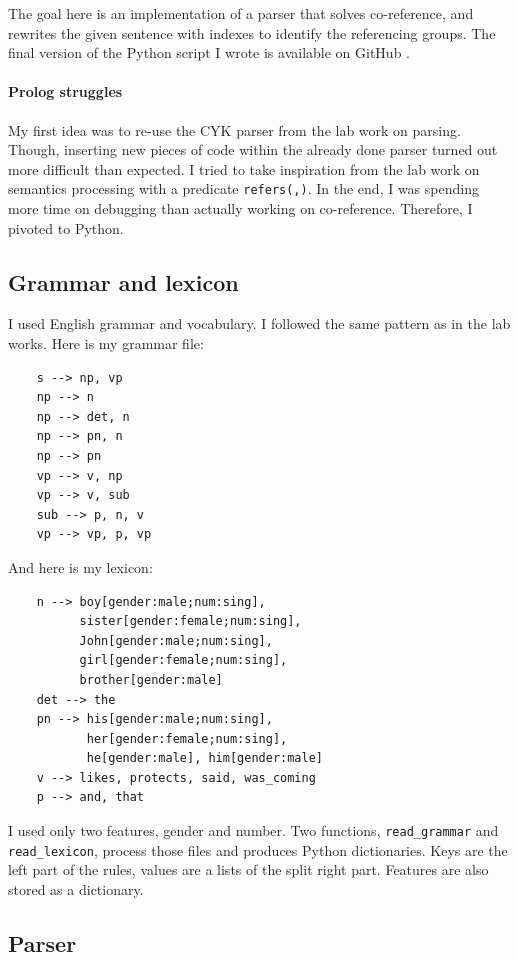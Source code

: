 \documentclass[a4paper]{article}
\theoremstyle{definition}
\begin{document}
The goal here is an implementation of a parser that solves co-reference, and rewrites the given sentence with indexes to identify the referencing groups. The final version of the Python script I wrote is available on GitHub \cite{github}.

\paragraph{Prolog struggles} My first idea was to re-use the CYK parser from the lab work on parsing. Though, inserting new pieces of code within the already done parser turned out more difficult than expected. I tried to take inspiration from the lab work on semantics processing with a predicate \texttt{refers(,)}. In the end, I was spending more time on debugging than actually working on co-reference. Therefore, I pivoted to Python.

\subsection{Grammar and lexicon}

I used English grammar and vocabulary. I followed the same pattern as in the lab works. Here is my grammar file:
\begin{verbatim}
    s --> np, vp
    np --> n
    np --> det, n
    np --> pn, n
    np --> pn
    vp --> v, np
    vp --> v, sub
    sub --> p, n, v
    vp --> vp, p, vp
\end{verbatim}
And here is my lexicon:
\begin{verbatim}
    n --> boy[gender:male;num:sing],
          sister[gender:female;num:sing],
          John[gender:male;num:sing],
          girl[gender:female;num:sing],
          brother[gender:male]
    det --> the
    pn --> his[gender:male;num:sing],
           her[gender:female;num:sing],
           he[gender:male], him[gender:male]
    v --> likes, protects, said, was_coming
    p --> and, that
\end{verbatim}
I used only two features, gender and number. Two functions, \texttt{read\_grammar} and \texttt{read\_lexicon}, process those files and produces Python dictionaries. Keys are the left part of the rules, values are a lists of the split right part. Features are also stored as a dictionary.

\subsection{Parser}
\end{document}

